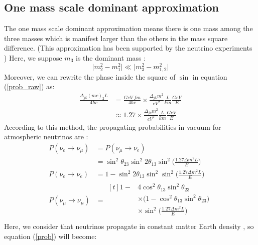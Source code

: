 \documentclass[12pt]{article}
\begin{document}
\begin{multicols}{2}
        \subsection{One mass scale dominant approximation}
        The one mass scale dominant approximation means there is one mass among the three masses which is manifest larger than the others in the mass square difference. (This approximation has been supported by the neutrino experiments \cite{SKexp}) Here, we suppose $m_3$ is the dominant mass :
        \[
            \big| m_{2}^{2} - m_{1}^{2} \big| \ll \big| m_{3}^{2} - m_{1,2}^{2} \big|
        \]
        Moreover, we can rewrite the phase inside the square of $\sin$ in equation (\ref{prob_raw}) as:
        \begin{align*}
            \frac{\Delta_{jk}(mc)_{2}L}{4 \hbar c} &= \frac{GeV\ fm}{4 \hbar c} \times \frac{\Delta_{jk} m^2}{eV^2} \frac{L}{km} \frac{GeV}{E}\\
            &\approx 1.27 \times \frac{\Delta_{jk} m^2}{eV^2} \frac{L}{km} \frac{GeV}{E}
        \end{align*}
        According to this method, the propagating probabilities in vacuum for atmospheric neutrinos are \cite{SKexp} : 
        \begin{align*}
                P(\nu_{e} \rightarrow \nu_{\mu})    &= P(\nu_{\mu}\rightarrow \nu_{e})\\
                                                    &= \sin^{2}\theta_{23} \sin^{2} 2\theta_{13} \sin^{2}\Big( \frac{1.27 \Delta m^{2} L}{E} \Big) \tag{II}\label{prob} \\
                P(\nu_{e} \rightarrow \nu_{e})      &= 1 - \sin^{2} 2\theta_{13}\sin^{2} \sin^{2}\Big( \frac{1.27\Delta m^{2} L}{E} \Big)\\ 
                P(\nu_{\mu} \rightarrow \nu_{\mu})  &= \begin{aligned}[t]
                                                            1 - &4 \cos^{2}\theta_{13}\sin^{2}\theta_{23}\\
                                                                &\times \big( 1 - \cos^{2}\theta_{13}\sin^{2} \theta_{23} \big)\\
                                                                &\times \sin^{2}\Big( \frac{1.27\Delta m^{2} L}{E} \Big)\\
                                                        \end{aligned}
        \end{align*}
        Here, we consider that neutrinos propagate in constant matter Earth density \cite{SKexp}, so equation (\ref{prob}) will become:

\end{multicols}
\end{document}
